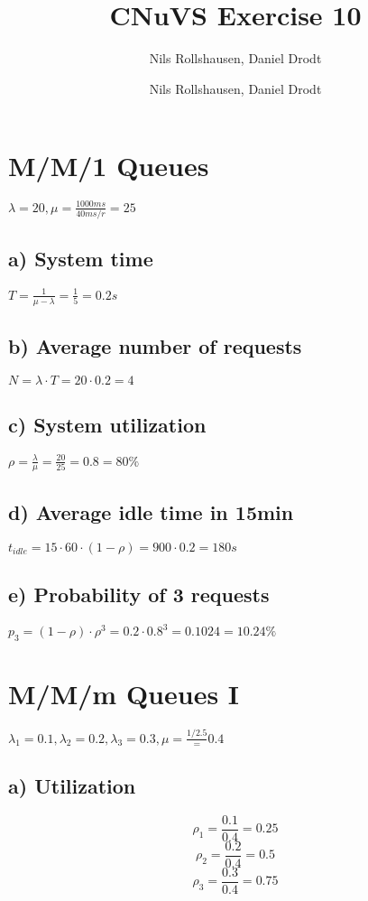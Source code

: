 \documentclass[a4paper, 11 pt, article, accentcolor=tud7b]{tudreport}
\title{CNuVS Exercise 10}
\author{Nils Rollshausen, Daniel Drodt}
\subtitle{Nils Rollshausen, Daniel Drodt}
\begin{document}
	\maketitle
	\section{M/M/1 Queues}
	$\lambda = 20, \mu = \frac{1000ms}{40ms/r} = 25$
	\subsection*{a) System time}
	$T = \frac{1}{\mu - \lambda} = \frac{1}{5} = 0.2s$
	
	\subsection*{b) Average number of requests}
	$N = \lambda \cdot T = 20 \cdot 0.2 = 4$
	
	\subsection*{c) System utilization}
	$\rho = \frac{\lambda}{\mu} = \frac{20}{25} = 0.8 = 80\%$
	
	\subsection*{d) Average idle time in 15min}
	$t_{idle} = 15 \cdot 60 \cdot (1 - \rho) = 900 \cdot 0.2 = 180s$
	
	\subsection*{e) Probability of 3 requests}
	$p_{3} = (1 - \rho) \cdot \rho^3 = 0.2 \cdot 0.8^3 = 0.1024 = 10.24\%$
	
	\section{M/M/m Queues I}
	
	$\lambda_{1} = 0.1, \lambda_{2} = 0.2, \lambda_{3} = 0.3, \mu = \frac{1/2.5} = 0.4$
	
	\subsection*{a) Utilization}
	$$\rho_{1} = \frac{0.1}{0.4} = 0.25$$ 
	$$\rho_{2} = \frac{0.2}{0.4} = 0.5 $$
	$$\rho_{3} = \frac{0.3}{0.4} = 0.75$$
	
\end{document}

